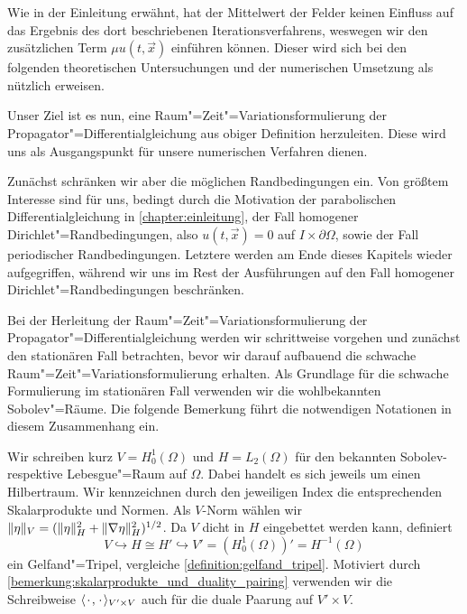 \documentclass[../main.tex]{subfiles}
\begin{document}
Wie in der Einleitung erwähnt, hat der Mittelwert der Felder keinen Einfluss auf das Ergebnis des dort beschriebenen Iterationsverfahrens, weswegen wir den zusätzlichen Term $\mu u(t, \vec{x})$ einführen können.
Dieser wird sich bei den folgenden theoretischen Untersuchungen und der numerischen Umsetzung als nützlich erweisen.

Unser Ziel ist es nun, eine Raum"=Zeit"=Variationsformulierung der Propagator"=Differentialgleichung aus obiger Definition herzuleiten.
Diese wird uns als Ausgangspunkt für unsere numerischen Verfahren dienen.

Zunächst schränken wir aber die möglichen Randbedingungen ein.
Von größtem Interesse sind für uns, bedingt durch die Motivation der parabolischen Differentialgleichung in \cref{chapter:einleitung}, der Fall homogener Dirichlet"=Randbedingungen, also $u(t, \vec{x}) = 0$ auf $I \times \partial \Omega$, sowie der Fall periodischer Randbedingungen.
Letztere werden am Ende dieses Kapitels wieder aufgegriffen, während wir uns im Rest der Ausführungen auf den Fall homogener Dirichlet"=Randbedingungen beschränken.

Bei der Herleitung der Raum"=Zeit"=Variationsformulierung der Propagator"=Differentialgleichung werden wir schrittweise vorgehen und zunächst den stationären Fall betrachten, bevor wir darauf aufbauend die schwache Raum"=Zeit"=Variationsformulierung erhalten.
Als Grundlage für die schwache Formulierung im stationären Fall verwenden wir die wohlbekannten Sobolev"=Räume.
Die folgende Bemerkung führt die notwendigen Notationen in diesem Zusammenhang ein.

\begin{Bemerkung}
\label{bemerkung:raeume_und_gelfand_tripel}
    Wir schreiben kurz $V = H^{1}_{0}(\Omega)$ und $H = L_{2}(\Omega)$ für den bekannten Sobolev- respektive Lebesgue"=Raum auf $\Omega$.
    Dabei handelt es sich jeweils um einen Hilbertraum.
    Wir kennzeichnen durch den jeweiligen Index die entsprechenden Skalarprodukte und Normen.
    Als $V$-Norm wählen wir $\lVert\eta\rVert_{V} = (\lVert\eta\rVert^{2}_{H} + \lVert\nabla \eta\rVert^{2}_{H})^{1/2}$.
    Da $V$ dicht in $H$ eingebettet werden kann, definiert
    \begin{equation}
        V \hookrightarrow H \cong H' \hookrightarrow V' = (H^{1}_{0}(\Omega))' = H^{-1}(\Omega)
    \end{equation}
    ein Gelfand"=Tripel, vergleiche \cref{definition:gelfand_tripel}.
    Motiviert durch \cref{bemerkung:skalarprodukte_und_duality_pairing} verwenden wir die Schreibweise $\langle{\mkern2mu\cdot\mkern2mu},{\mkern2mu\cdot\mkern2mu}\rangle_{V' \times V}$ auch für die duale Paarung auf $V' \times V$.
\end{Bemerkung}
\end{document}
